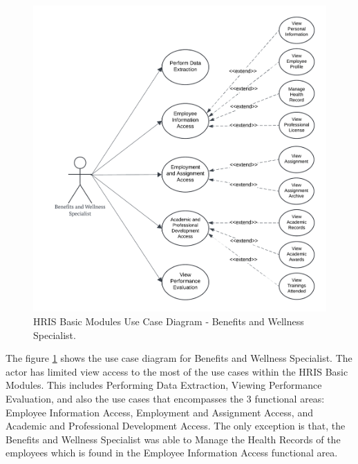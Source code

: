     \begin{figure}[H]
        \centering
        \includegraphics[width=0.9\linewidth]{figures/images/diagrams/usecase/use-case-basic-6.png}
        \caption{HRIS Basic Modules Use Case Diagram - Benefits and Wellness Specialist.}
        \label{fig:use-case-basic-6}
    \end{figure}

    The figure \ref{fig:use-case-basic-6} shows the use case diagram for Benefits and Wellness Specialist. The actor has limited view access to the most of the use cases within the HRIS Basic Modules. This includes Performing Data Extraction, Viewing Performance Evaluation, and also the use cases that  encompasses the 3 functional areas: Employee Information Access, Employment and Assignment Access, and Academic and Professional Development Access. The only exception is that, the Benefits and Wellness Specialist was able to Manage the Health Records of the employees which is found in the Employee Information Access functional area.

